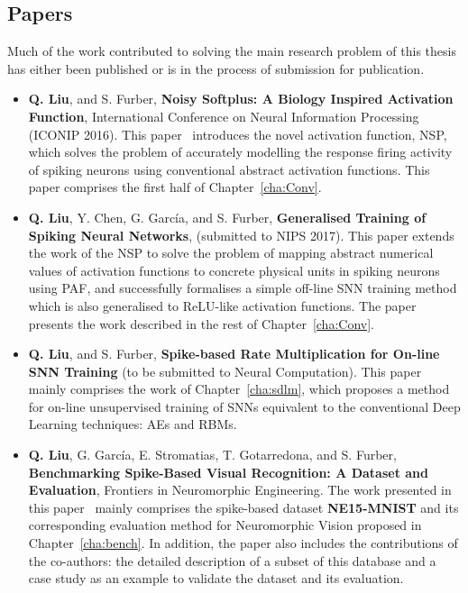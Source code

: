 \subsection{Papers}
	Much of the work contributed to solving the main research problem of this thesis has either been published or is in the process of submission for publication.
\begin{itemize}

	\item 
	\textbf{Q. Liu}, and S. Furber, \textbf{Noisy Softplus: A Biology Inspired Activation Function}, International Conference on Neural Information Processing (ICONIP 2016). 
	This paper~\citep{liu2016noisy} introduces the novel activation function, NSP, 
	which solves the problem of accurately modelling the response firing activity of spiking neurons using conventional abstract activation functions.
	This paper comprises the first half of Chapter~\ref{cha:Conv}.

	\item 
	\textbf{Q. Liu}, Y. Chen, G. Garc\'ia, and S. Furber, \textbf{Generalised Training of Spiking Neural Networks}, (submitted to NIPS 2017).
	This paper extends the work of the NSP to solve the problem of mapping abstract numerical values of activation functions to concrete physical units in spiking neurons using PAF, and successfully formalises a simple off-line SNN training method which is also generalised to ReLU-like activation functions.
	The paper presents the work described in the rest of Chapter~\ref{cha:Conv}.

	
	\item 
	\textbf{Q. Liu}, and S. Furber, \textbf{Spike-based Rate Multiplication for On-line SNN Training} (to be submitted to Neural Computation).
	This paper mainly comprises the work of Chapter~\ref{cha:sdlm}, which proposes a method for on-line unsupervised training of SNNs equivalent to the conventional Deep Learning techniques: AEs and RBMs.

	\item 
	\textbf{Q. Liu}, G. Garc\'ia, E. Stromatias, T. Gotarredona, and S. Furber, \textbf{Benchmarking Spike-Based Visual Recognition: A Dataset and Evaluation}, Frontiers in Neuromorphic Engineering.
	The work presented in this paper~\citep{liu2016bench} mainly comprises the spike-based dataset \textbf{NE15-MNIST} and its corresponding evaluation method for Neuromorphic Vision proposed in Chapter~\ref{cha:bench}.
	In addition, the paper also includes the contributions of the co-authors: the detailed description of a subset of this database and a case study as an example to validate the dataset and its evaluation. 

\end{itemize}

